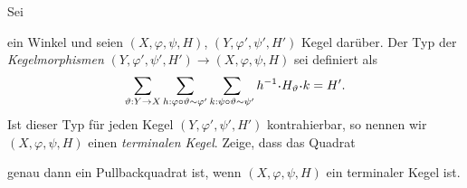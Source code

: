 \documentclass{uebung}
\begin{document}
\begin{exercise}
  Sei
  ein Winkel und seien $(X,\varphi,\psi,H)$, $(Y,\varphi',\psi',H')$ Kegel darüber.
  Der Typ der \emph{Kegelmorphismen} $(Y,\varphi',\psi',H')\to (X,\varphi,\psi,H)$ sei definiert als
  $$
  \sum_{\vartheta:Y \to X}
  \sum_{h:\varphi\circ\vartheta\sim\varphi'}
  \sum_{k:\psi\circ\vartheta\sim\psi'}
  h^{-1} \kon H_\vartheta \kon k = H'.
  $$
  Ist dieser Typ für jeden Kegel $(Y,\varphi',\psi',H')$ kontrahierbar, so nennen wir $(X,\varphi,\psi,H)$ einen \emph{terminalen Kegel}.
  Zeige, dass das Quadrat
  \begin{center}
  \end{center}
  genau dann ein Pullbackquadrat ist, wenn $(X,\varphi,\psi,H)$ ein terminaler Kegel ist.
\end{exercise}

\begin{exercise}
\end{exercise}
\end{document}
